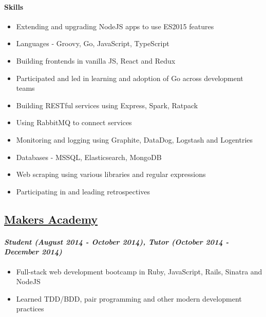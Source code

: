\hypertarget{skills-1}{%
\paragraph{Skills}\label{skills-1}}

\begin{itemize}
\tightlist
\item
  Extending and upgrading NodeJS apps to use ES2015 features
\item
  Languages - Groovy, Go, JavaScript, TypeScript
\item
  Building frontends in vanilla JS, React and Redux
\item
  Participated and led in learning and adoption of Go across development
  teams
\item
  Building RESTful services using Express, Spark, Ratpack
\item
  Using RabbitMQ to connect services
\item
  Monitoring and logging using Graphite, DataDog, Logstash and
  Logentries
\item
  Databases - MSSQL, Elasticsearch, MongoDB
\item
  Web scraping using various libraries and regular expressions
\item
  Participating in and leading retrospectives
\end{itemize}

\hypertarget{makers-academy}{%
\subsection{\texorpdfstring{\href{http://www.makersacademy.com/}{Makers
Academy}}{Makers Academy}}\label{makers-academy}}

\hypertarget{student-august-2014---october-2014-tutor-october-2014---december-2014}{%
\paragraph{\texorpdfstring{\emph{Student (August 2014 - October 2014),
Tutor (October 2014 - December
2014)}}{Student (August 2014 - October 2014), Tutor (October 2014 - December 2014)}}\label{student-august-2014---october-2014-tutor-october-2014---december-2014}}

\begin{itemize}
\tightlist
\item
  Full-stack web development bootcamp in Ruby, JavaScript, Rails,
  Sinatra and NodeJS
\item
  Learned TDD/BDD, pair programming and other modern development
  practices
\end{itemize}

